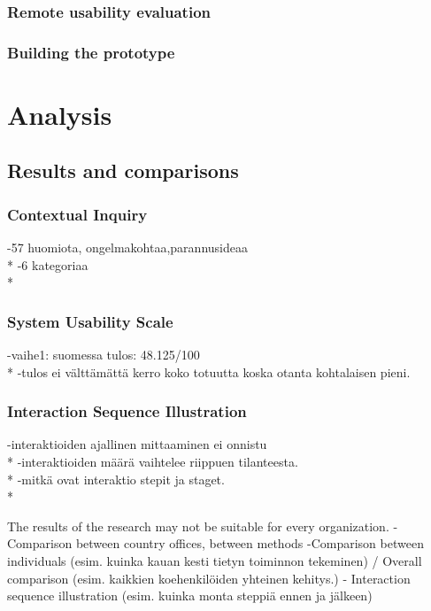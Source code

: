 \documentclass[12pt,a4paper,oneside,pdftex]{report}
\begin{document}
	  \subsection{Remote usability evaluation}
	\subsection{Building the prototype}
    	
\chapter{Analysis}
\label{chapter:analysis}

    \section{Results and comparisons}
    \label{sec:results}
    
    \subsection{Contextual Inquiry}
    -57 huomiota, ongelmakohtaa,parannusideaa 
    \\*
    -6 kategoriaa
    \\*

    \subsection{System Usability Scale}
     -vaihe1: suomessa tulos: 48.125/100
     \\*
     -tulos ei välttämättä kerro koko totuutta koska otanta kohtalaisen pieni.
     
     \subsection{Interaction Sequence Illustration}
     	  -interaktioiden ajallinen mittaaminen ei onnistu
	  \\*
	  -interaktioiden määrä vaihtelee riippuen tilanteesta.
	  \\*
	  -mitkä ovat interaktio stepit ja staget.
	  \\*
     
     The results of the research may not be suitable for every organization.
    -Comparison between country offices, between methods
    -Comparison between individuals (esim. kuinka kauan kesti tietyn toiminnon tekeminen) / Overall comparison (esim. kaikkien koehenkilöiden yhteinen kehitys.)
- Interaction sequence illustration (esim. kuinka monta steppiä ennen ja jälkeen)
\end{document}
